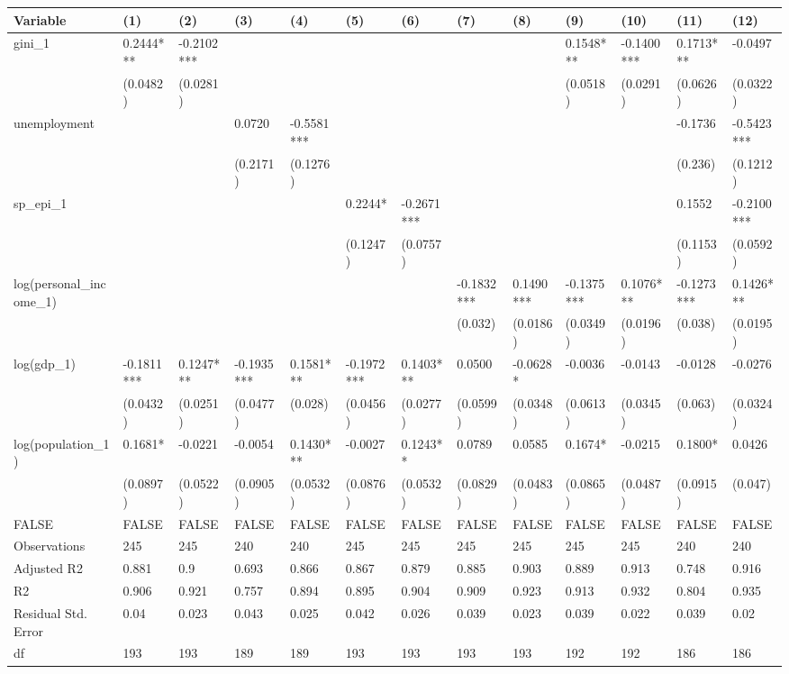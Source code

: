 
\begin{tabular}{l|l|l|l|l|l|l|l|l|l|l|l|l}
\hline
Variable & (1) & (2) & (3) & (4) & (5) & (6) & (7) & (8) & (9) & (10) & (11) & (12)\\
\hline
gini\_1 & 0.2444*** & -0.2102*** &  &  &  &  &  &  & 0.1548*** & -0.1400*** & 0.1713*** & -0.0497\\
\hline
 & (0.0482) & (0.0281) &  &  &  &  &  &  & (0.0518) & (0.0291) & (0.0626) & (0.0322)\\
\hline
unemployment &  &  & 0.0720 & -0.5581*** &  &  &  &  &  &  & -0.1736 & -0.5423***\\
\hline
 &  &  & (0.2171) & (0.1276) &  &  &  &  &  &  & (0.236) & (0.1212)\\
\hline
sp\_epi\_1 &  &  &  &  & 0.2244* & -0.2671*** &  &  &  &  & 0.1552 & -0.2100***\\
\hline
 &  &  &  &  & (0.1247) & (0.0757) &  &  &  &  & (0.1153) & (0.0592)\\
\hline
log(personal\_income\_1) &  &  &  &  &  &  & -0.1832*** & 0.1490*** & -0.1375*** & 0.1076*** & -0.1273*** & 0.1426***\\
\hline
 &  &  &  &  &  &  & (0.032) & (0.0186) & (0.0349) & (0.0196) & (0.038) & (0.0195)\\
\hline
log(gdp\_1) & -0.1811*** & 0.1247*** & -0.1935*** & 0.1581*** & -0.1972*** & 0.1403*** & 0.0500 & -0.0628* & -0.0036 & -0.0143 & -0.0128 & -0.0276\\
\hline
 & (0.0432) & (0.0251) & (0.0477) & (0.028) & (0.0456) & (0.0277) & (0.0599) & (0.0348) & (0.0613) & (0.0345) & (0.063) & (0.0324)\\
\hline
log(population\_1) & 0.1681* & -0.0221 & -0.0054 & 0.1430*** & -0.0027 & 0.1243** & 0.0789 & 0.0585 & 0.1674* & -0.0215 & 0.1800* & 0.0426\\
\hline
 & (0.0897) & (0.0522) & (0.0905) & (0.0532) & (0.0876) & (0.0532) & (0.0829) & (0.0483) & (0.0865) & (0.0487) & (0.0915) & (0.047)\\
\hline
FALSE & FALSE & FALSE & FALSE & FALSE & FALSE & FALSE & FALSE & FALSE & FALSE & FALSE & FALSE & FALSE\\
\hline
Observations & 245 & 245 & 240 & 240 & 245 & 245 & 245 & 245 & 245 & 245 & 240 & 240\\
\hline
Adjusted R2 & 0.881 & 0.9 & 0.693 & 0.866 & 0.867 & 0.879 & 0.885 & 0.903 & 0.889 & 0.913 & 0.748 & 0.916\\
\hline
R2 & 0.906 & 0.921 & 0.757 & 0.894 & 0.895 & 0.904 & 0.909 & 0.923 & 0.913 & 0.932 & 0.804 & 0.935\\
\hline
Residual Std. Error & 0.04 & 0.023 & 0.043 & 0.025 & 0.042 & 0.026 & 0.039 & 0.023 & 0.039 & 0.022 & 0.039 & 0.02\\
\hline
df & 193 & 193 & 189 & 189 & 193 & 193 & 193 & 193 & 192 & 192 & 186 & 186\\
\hline
\end{tabular}

